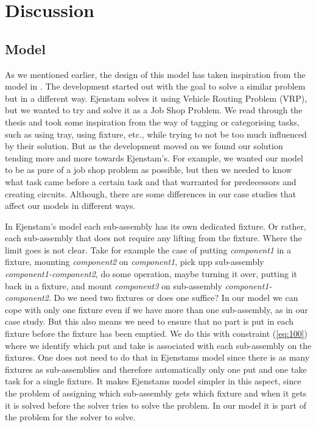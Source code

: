 \chapter{Discussion}\label{cha:discuss}

\section{Model}
As we mentioned earlier, the design of this model has taken inspiration from the model in \cite{ejenstam_2014}. The development started out with the goal to solve a similar problem but in a different way. Ejenstam solves it using Vehicle Routing Problem (VRP), but we wanted to try and solve it as a Job Shop Problem. We read through the thesis and took some inspiration from the way of tagging or categorising tasks, such as using tray, using fixture, etc., while trying to not be too much influenced by their solution. But as the development moved on we found our solution tending more and more towards Ejenstam's. For example, we wanted our model to be as pure of a job shop problem as possible, but then we needed to know what task came before a certain task and that warranted for predecessors and creating circuits. Although, there are some differences in our case studies that affect our models in different ways.

In Ejenstam's model each sub-assembly has its own dedicated fixture. Or rather, each sub-assembly that does not require any lifting from the fixture. Where the limit goes is not clear. Take for example the case of putting \emph{component1} in a fixture, mounting \emph{component2} on \emph{component1}, pick upp sub-assembly \emph{component1-component2}, do some operation, maybe turning it over, putting it back in a fixture, and mount \emph{component3} on sub-assembly \emph{component1-component2}. Do we need two fixtures or does one suffice? In our model we can cope with only one fixture even if we have more than one sub-assembly, as in our case study. But this also means we need to ensure that no part is put in each fixture before the fixture has been emptied. We do this with constraint (\ref{eq:100}) where we identify which put and take is associated with each sub-assembly on the fixtures. One does not need to do that in Ejenstams model since there is as many fixtures as sub-assemblies and therefore automatically only one put and one take task for a single fixture. It makes Ejenstams model simpler in this aspect, since the problem of assigning which sub-assembly gets which fixture and when it gets it is solved before the solver tries to solve the problem. In our model it is part of the problem for the solver to solve.

